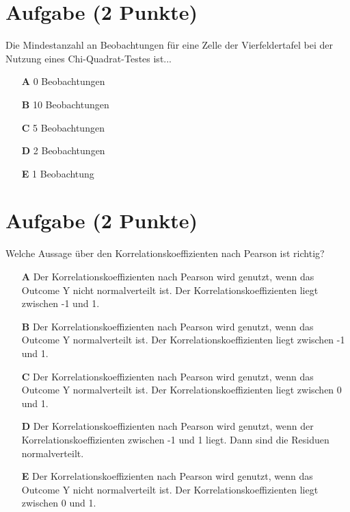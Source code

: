 \documentclass[a4paper, 10pt]{scrartcl}\usepackage[]{graphicx}\usepackage[]{xcolor}
\begin{document}
\section{Aufgabe \hfill (2 Punkte)}

Die Mindestanzahl an Beobachtungen f{\"u}r eine Zelle der Vierfeldertafel bei
der Nutzung eines Chi-Quadrat-Testes ist...



\begin{enumerate}
\item [\textbf{A} \msquare] 0 Beobachtungen
\item [\textbf{B} \msquare] 10 Beobachtungen
\item [\textbf{C} \msquare] 5 Beobachtungen
\item [\textbf{D} \msquare] 2 Beobachtungen
\item [\textbf{E} \msquare] 1 Beobachtung
\end{enumerate} 

\section{Aufgabe \hfill (2 Punkte)}




Welche Aussage {\"u}ber den Korrelationskoeffizienten nach Pearson
ist richtig?



\begin{enumerate}
\item [\textbf{A} \msquare] Der Korrelationskoeffizienten nach Pearson wird genutzt, wenn das Outcome Y nicht normalverteilt ist. Der Korrelationskoeffizienten liegt zwischen -1 und 1.
\item [\textbf{B} \msquare] Der Korrelationskoeffizienten nach Pearson wird genutzt, wenn das Outcome Y normalverteilt ist. Der Korrelationskoeffizienten liegt zwischen -1 und 1.
\item [\textbf{C} \msquare] Der Korrelationskoeffizienten nach Pearson wird genutzt, wenn das Outcome Y normalverteilt ist. Der Korrelationskoeffizienten liegt zwischen 0 und 1.
\item [\textbf{D} \msquare] Der Korrelationskoeffizienten nach Pearson wird genutzt, wenn der Korrelationskoeffizienten zwischen -1 und 1 liegt. Dann sind die Residuen normalverteilt.
\item [\textbf{E} \msquare] Der Korrelationskoeffizienten nach Pearson wird genutzt, wenn das Outcome Y nicht normalverteilt ist. Der Korrelationskoeffizienten liegt zwischen 0 und 1.
\end{enumerate} 
\end{document}
